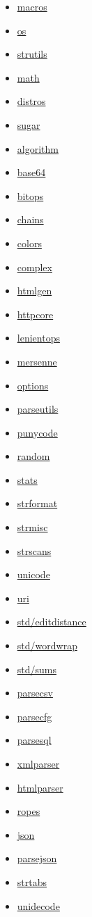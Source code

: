 \begin{itemize}
\tightlist
\item
  \href{macros.html}{macros}
\item
  \href{os.html}{os}
\item
  \href{strutils.html}{strutils}
\item
  \href{math.html}{math}
\item
  \href{distros.html}{distros}
\item
  \href{sugar.html}{sugar}
\item
  \href{algorithm.html}{algorithm}
\item
  \href{base64.html}{base64}
\item
  \href{bitops.html}{bitops}
\item
  \href{chains.html}{chains}
\item
  \href{colors.html}{colors}
\item
  \href{complex.html}{complex}
\item
  \href{htmlgen.html}{htmlgen}
\item
  \href{httpcore.html}{httpcore}
\item
  \href{lenientops.html}{lenientops}
\item
  \href{mersenne.html}{mersenne}
\item
  \href{options.html}{options}
\item
  \href{parseutils.html}{parseutils}
\item
  \href{punycode.html}{punycode}
\item
  \href{punycode.html}{random}
\item
  \href{stats.html}{stats}
\item
  \href{strformat.html}{strformat}
\item
  \href{strmisc.html}{strmisc}
\item
  \href{strscans.html}{strscans}
\item
  \href{unicode.html}{unicode}
\item
  \href{uri.html}{uri}
\item
  \href{editdistance.html}{std/editdistance}
\item
  \href{wordwrap.html}{std/wordwrap}
\item
  \href{sums.html}{std/sums}
\item
  \href{parsecsv.html}{parsecsv}
\item
  \href{parsecfg.html}{parsecfg}
\item
  \href{parsesql.html}{parsesql}
\item
  \href{xmlparser.html}{xmlparser}
\item
  \href{htmlparser.html}{htmlparser}
\item
  \href{ropes.html}{ropes}
\item
  \href{json.html}{json}
\item
  \href{parsejson.html}{parsejson}
\item
  \href{strtabs.html}{strtabs}
\item
  \href{unidecode.html}{unidecode}
\end{itemize}

